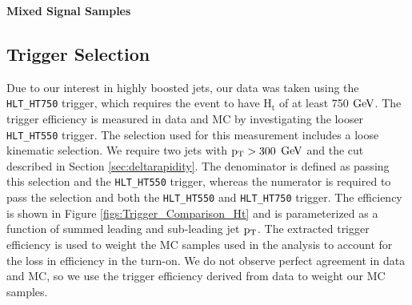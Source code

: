 \begin{table}
\begin{center}
\bf{Mixed Signal Samples}
\end{center}
\caption{Mixed-Coupling signal samples used in the analysis.  Quoted cross-section and $\Gamma_{\wpr}$ were obtained from the CompHEP generator.  A k factor of 1.2 is implemented on the quoted cross-sections.  The cross sections listed here take into account the generator level b jet $\pt$ cut, and represent the visible cross section.  The efficiency of this cut is provided under the column labeled Selection Efficiency.}
\label{table:signalsetsmixed}
\end{table}


\subsection{Trigger Selection}
\label{sec:trigger}
Due to our interest in highly boosted jets, our data was taken using the \texttt{HLT\_HT750} trigger, which requires the event to have $\mathrm{H_t}$ of at least 750 $\mathrm{GeV}$. 
The trigger efficiency is measured in data and MC by investigating the looser \texttt{HLT\_HT550} trigger.  The selection used for this measurement includes a loose kinematic selection.  We require two jets 
with $\mathrm{p_{T}} > 300$ $\mathrm{GeV}$ and the cut described in Section \ref{sec:deltarapidity}.
The denominator is defined as passing this selection and the \texttt{HLT\_HT550} trigger, whereas the numerator is required to pass the selection and both the \texttt{HLT\_HT550} and \texttt{HLT\_HT750} trigger.  
The efficiency is shown in Figure \ref{figs:Trigger_Comparison_Ht} and is parameterized as a function of summed leading and sub-leading jet $\pt$.  The extracted trigger efficiency is used to weight 
the MC samples used in the analysis to account for the loss in efficiency in the turn-on.  We do not observe perfect agreement in data and MC, 
so we use the trigger efficiency derived from data to weight our MC samples.

